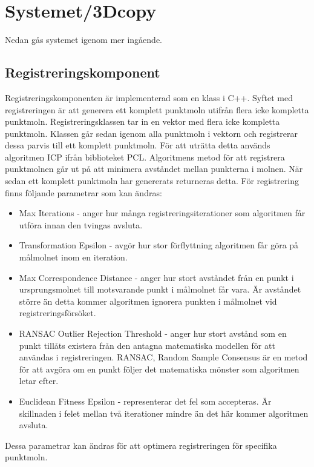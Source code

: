 \documentclass[a4paper,titlepage,12pt]{article}
\begin{document}
\newpage

\section{Systemet/3Dcopy} %
	Nedan gås systemet igenom mer ingående.
	
	\subsection{Registreringskomponent}
		Registreringskomponenten är implementerad som en klass i C++. Syftet med registreringen är att generera ett komplett punktmoln utifrån flera icke kompletta punktmoln. Registreringsklassen tar in en vektor med flera icke kompletta punktmoln. Klassen går sedan igenom alla punktmoln i vektorn och registrerar dessa parvis till ett komplett punktmoln. För att uträtta detta används algoritmen ICP ifrån biblioteket PCL. Algoritmens metod för att registrera punktmolnen går ut på att minimera avståndet mellan punkterna i molnen. När sedan ett komplett punktmoln har genererats returneras detta. För registrering finns följande parametrar som kan ändras:
		
		\begin{itemize}
			\item Max Iterations - anger hur många registreringsiterationer som algoritmen får utföra innan den tvingas avsluta.
			
			\item Transformation Epsilon - avgör hur stor förflyttning algoritmen får göra på målmolnet inom en iteration.
			
			\item Max Correspondence Distance - anger hur stort avståndet från en punkt i ursprungsmolnet till motsvarande punkt i målmolnet får vara. Är avståndet större än detta kommer algoritmen ignorera punkten i målmolnet vid registreringsförsöket. 
			
			\item RANSAC Outlier Rejection Threshold - anger hur stort avstånd som en punkt tillåts existera från den antagna matematiska modellen för att användas i registreringen. RANSAC, Random Sample Consensus är en metod för att avgöra om en punkt följer det matematiska mönster som algoritmen letar efter.
			
			\item Euclidean Fitness Epsilon - representerar det fel som accepteras. Är skillnaden i felet mellan två iterationer mindre än det här kommer algoritmen avsluta.
			 
		\end{itemize}
	Dessa parametrar kan ändras för att optimera registreringen för specifika punktmoln. 
	
\end{document}
